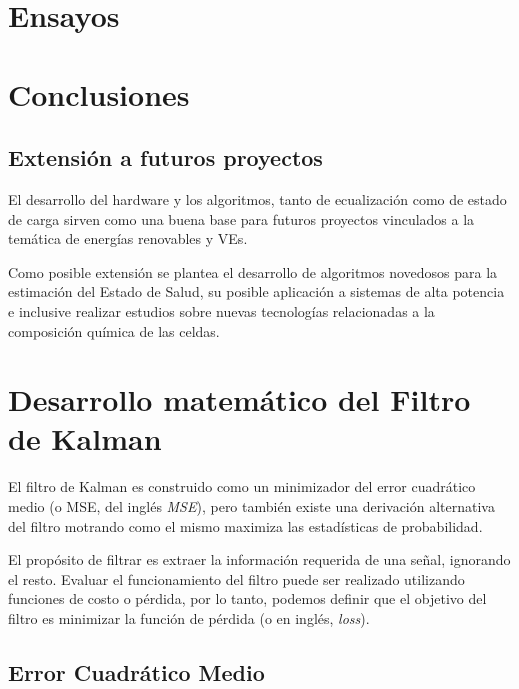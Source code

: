 \documentclass[10pt,a4paper]{article}
\begin{document}
\clearpage

\section{Ensayos}\label{ensayos}


\newpage

\section{Conclusiones}\label{conclusiones}

\subsection{Extensión a futuros proyectos}

El desarrollo del hardware y los algoritmos, tanto de ecualización como de
estado de carga sirven como una buena base para futuros proyectos vinculados a
la temática de energías renovables y \acrshort{VE}s.

Como posible extensión se plantea el desarrollo de algoritmos novedosos para la
estimación del Estado de Salud, su posible aplicación a sistemas de alta
potencia e inclusive realizar estudios sobre nuevas tecnologías relacionadas a
la composición química de las celdas.

\newpage

\printbibliography[heading=bibintoc]

\newpage

\appendix

\section{Desarrollo matem\'atico del Filtro de Kalman}\label{matKalman}

\noindent El filtro de Kalman es construido como un minimizador del error 
cuadr\'atico medio (o \acrshort{MSE}, del ingl\'es 
\emph{\acrlong{MSE}}), pero tambi\'en existe una derivaci\'on 
alternativa del filtro motrando como el mismo maximiza las estad\'isticas de 
probabilidad.

\noindent El prop\'osito de filtrar es extraer la informaci\'on requerida de una
señal, ignorando el resto. Evaluar el funcionamiento del filtro puede ser
realizado utilizando funciones de costo o p\'erdida, por lo tanto, podemos
definir que el objetivo del filtro es minimizar la funci\'on de p\'erdida (o en
ingl\'es, \emph{loss}).

\subsection{Error Cuadr\'atico Medio}
\end{document}
